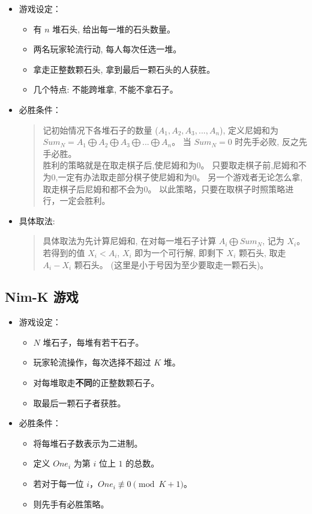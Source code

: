 \documentclass[a4paper,12pt]{article}
\begin{document}
\begin{itemize}
    \item 游戏设定：
    \begin{itemize}
        \item  有 $n$ 堆石头, 给出每一堆的石头数量。
        \item  两名玩家轮流行动, 每人每次任选一堆。
        \item 拿走正整数颗石头, 拿到最后一颗石头的人获胜。
        \item 几个特点: 不能跨堆拿, 不能不拿石子。
    \end{itemize}
    
    \item 必胜条件：
    \begin{quote}
        记初始情况下各堆石子的数量 ($A_1,A_2,A_3,...,A_n$), 
        定义尼姆和为 $Sum_N = A_1 \bigoplus A_2 \bigoplus A_3 \bigoplus ... \bigoplus A_n$。 
        当 $Sum_N = 0$ 时先手必败, 反之先手必胜。  \\
        
        胜利的策略就是在取走棋子后,使尼姆和为0。
        只要取走棋子前,尼姆和不为0,一定有办法取走部分棋子使尼姆和为0。
        另一个游戏者无论怎么拿,取走棋子后尼姆和都不会为0。
        以此策略，只要在取棋子时照策略进行，一定会胜利。
    \end{quote}

    \item 具体取法:
    \begin{quote}
        具体取法为先计算尼姆和, 在对每一堆石子计算 $A_i \bigoplus Sum_N$, 记为 $X_i$。
        若得到的值 $X_i < A_i$, $X_i$ 即为一个可行解, 即剩下 $X_i$ 颗石头, 取走 $A_i - X_i$ 颗石头。
        (这里是小于号因为至少要取走一颗石头)。        
    \end{quote}
\end{itemize}

\subsection{Nim-K 游戏}

\begin{itemize}
    \item 游戏设定：
    \begin{itemize}
        \item $N$ 堆石子，每堆有若干石子。
        \item 玩家轮流操作，每次选择不超过 $K$ 堆。
        \item 对每堆取走\textbf{不同}的正整数颗石子。
        \item 取最后一颗石子者获胜。
    \end{itemize}
    
    \item 必胜条件：
    \begin{itemize}
        \item 将每堆石子数表示为二进制。
        \item 定义 $One_i$ 为第 $i$ 位上 $1$ 的总数。
        \item 若对于每一位 $i$，$One_i \not\equiv 0 \pmod{K+1}$。
        \item 则先手有必胜策略。
    \end{itemize}
\end{itemize}
\end{document}
